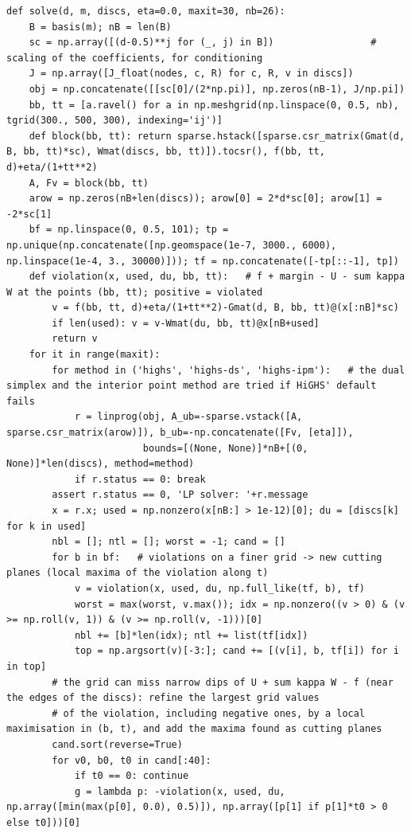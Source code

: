\documentclass[11pt,reqno]{amsart}
\numberwithin{equation}{section}
\theoremstyle{definition}
\theoremstyle{remark}
\begin{document}
\begin{lstlisting}
def solve(d, m, discs, eta=0.0, maxit=30, nb=26):
    B = basis(m); nB = len(B)
    sc = np.array([(d-0.5)**j for (_, j) in B])                 # scaling of the coefficients, for conditioning
    J = np.array([J_float(nodes, c, R) for c, R, v in discs])
    obj = np.concatenate([[sc[0]/(2*np.pi)], np.zeros(nB-1), J/np.pi])
    bb, tt = [a.ravel() for a in np.meshgrid(np.linspace(0, 0.5, nb), tgrid(300., 500, 300), indexing='ij')]
    def block(bb, tt): return sparse.hstack([sparse.csr_matrix(Gmat(d, B, bb, tt)*sc), Wmat(discs, bb, tt)]).tocsr(), f(bb, tt, d)+eta/(1+tt**2)
    A, Fv = block(bb, tt)
    arow = np.zeros(nB+len(discs)); arow[0] = 2*d*sc[0]; arow[1] = -2*sc[1]
    bf = np.linspace(0, 0.5, 101); tp = np.unique(np.concatenate([np.geomspace(1e-7, 3000., 6000), np.linspace(1e-4, 3., 30000)])); tf = np.concatenate([-tp[::-1], tp])
    def violation(x, used, du, bb, tt):   # f + margin - U - sum kappa W at the points (bb, tt); positive = violated
        v = f(bb, tt, d)+eta/(1+tt**2)-Gmat(d, B, bb, tt)@(x[:nB]*sc)
        if len(used): v = v-Wmat(du, bb, tt)@x[nB+used]
        return v
    for it in range(maxit):
        for method in ('highs', 'highs-ds', 'highs-ipm'):   # the dual simplex and the interior point method are tried if HiGHS' default fails
            r = linprog(obj, A_ub=-sparse.vstack([A, sparse.csr_matrix(arow)]), b_ub=-np.concatenate([Fv, [eta]]),
                        bounds=[(None, None)]*nB+[(0, None)]*len(discs), method=method)
            if r.status == 0: break
        assert r.status == 0, 'LP solver: '+r.message
        x = r.x; used = np.nonzero(x[nB:] > 1e-12)[0]; du = [discs[k] for k in used]
        nbl = []; ntl = []; worst = -1; cand = []
        for b in bf:   # violations on a finer grid -> new cutting planes (local maxima of the violation along t)
            v = violation(x, used, du, np.full_like(tf, b), tf)
            worst = max(worst, v.max()); idx = np.nonzero((v > 0) & (v >= np.roll(v, 1)) & (v >= np.roll(v, -1)))[0]
            nbl += [b]*len(idx); ntl += list(tf[idx])
            top = np.argsort(v)[-3:]; cand += [(v[i], b, tf[i]) for i in top]
        # the grid can miss narrow dips of U + sum kappa W - f (near the edges of the discs): refine the largest grid values
        # of the violation, including negative ones, by a local maximisation in (b, t), and add the maxima found as cutting planes
        cand.sort(reverse=True)
        for v0, b0, t0 in cand[:40]:
            if t0 == 0: continue
            g = lambda p: -violation(x, used, du, np.array([min(max(p[0], 0.0), 0.5)]), np.array([p[1] if p[1]*t0 > 0 else t0]))[0]

\end{lstlisting}
\end{document}
